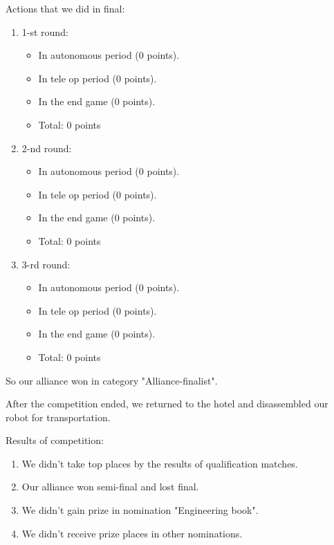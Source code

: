 Actions that we did in final:
\begin{enumerate}
	\item 1-st round:
	\begin{itemize}
	    \item In autonomous period (0 points).
	
	    \item In tele op period (0 points).
	
	    \item In the end game  (0 points).
	
	    \item Total: 0 points
	\end{itemize}
	\item 2-nd round:
	\begin{itemize}
		\item In autonomous period (0 points).
		
		\item In tele op period (0 points).
		
		\item In the end game  (0 points).
		
		\item Total: 0 points
	\end{itemize}
	\item 3-rd round:
	\begin{itemize}
		\item In autonomous period (0 points).
		
		\item In tele op period (0 points).
		
		\item In the end game  (0 points).
		
		\item Total: 0 points
	\end{itemize}
\end{enumerate}


So our alliance won in category "Alliance-finalist".\newline

After the competition ended, we returned to the hotel and disassembled our robot for transportation.

Results of competition:
\begin{enumerate}
	\item We didn't take top places by the results of qualification matches.
	
	\item Our alliance won semi-final and lost final.
	
	\item We didn't gain prize in nomination "Engineering book".
	
	\item We didn't receive prize places in other nominations.
\end{enumerate}

